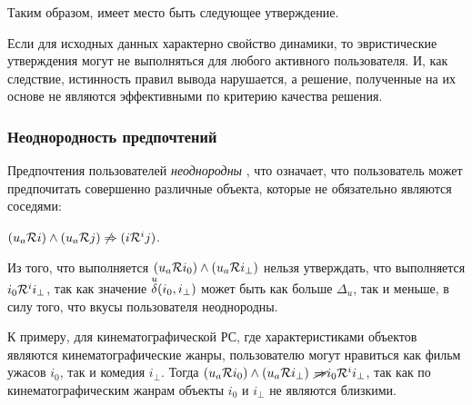 Таким образом, имеет место быть следующее утверждение.
\begin{assert}
	\label{ass:dynamic}
Если для исходных данных характерно свойство динамики, то
эвристические утверждения могут не выполняться для любого активного
пользователя. И, как следствие, истинность правил вывода нарушается, а решение,
полученные на их основе не являются эффективными по критерию качества решения.
\end{assert}
%

\subsubsection{Неоднородность предпочтений}
Предпочтения пользователей {\it неоднородны} \cite{psy, hetero-spotify,hetero1}, что означает, что
пользователь может предпочитать совершенно различные объекта, которые не
обязательно являются соседями:
\begin{assert}\label{neodnorodost}
$(u_a \mathcal{R} i) \wedge (u_a \mathcal{R} j) \not \Rightarrow (i \mathcal{R}^i j)$.
\end{assert}

Из того, что выполняется $(u_a \mathcal{R} i_0) \wedge (u_a \mathcal{R} i_{\bot})$
нельзя утверждать, что выполняется $i_0 \mathcal{R}^i i_{\bot}$, так как значение
${\overset{u}{\mathcal{\delta}}}(i_0, i_{\bot})$ может быть как больше $\Delta_u$, так и меньше,
в силу того, что вкусы пользователя неоднородны.

К примеру, для кинематографической РС, где характеристиками объектов
являются кинематографические жанры, пользователю могут нравиться как фильм
ужасов $i_0$, так и комедия $i_{\bot}$. Тогда
$(u_a \mathcal{R} i_0) \wedge (u_a \mathcal{R} i_{\bot})$
$\cancel{\Rightarrow} i_0 \mathcal{R}^i i_{\bot}$,
так как по кинематографическим жанрам объекты $i_0$ и $i_{\bot}$ не являются
близкими.


